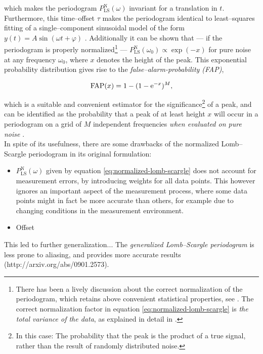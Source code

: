 which makes the periodogram $P^{\text{N}}_{\text{LS}}(\omega)$ invariant for a translation in $t$. Furthermore, this time--offset $\tau$ makes the periodogram identical to least--squares fitting of a single--component sinusoidal model of the form $y(t) = A \sin(\omega t + \varphi)$ \citep{horne1986, vanderplas2015}. Additionally it can be shown that --- if the periodogram is properly normalized\footnote{There has been a lively discussion about the correct normalization of the periodogram, which retains above convenient statistical properties, see \citet{lomb1976,astroML,zechmeister2009}. The correct normalization factor in equation \ref{eq:normalized-lomb-scargle} is \emph{the total variance of the data}, as explained in detail in \citet{horne1986}.} --- $P^{\text{N}}_{\text{LS}}(\omega_0) \propto \exp(-x)$ for pure noise at any frequency $\omega_0$, where $x$ denotes the height of the peak. This exponential probability distribution gives rise to the \emph{false--alarm-probability (FAP)},

\begin{equation}
\text{FAP}(x) = 1 - (1 - \mathrm{e}^{-x})^M,
\end{equation}

which is a suitable and convenient estimator for the significance\footnote{In this case: The probability that the peak is the product of a true signal, rather than the result of randomly distributed noise.} of a peak, and can be identified as the probability that a peak of at least height $x$ will occur in a periodogram on a grid of $M$ independent frequencies \emph{when evaluated on pure noise} \citep{horne1986}.\\

In spite of its usefulness, there are some drawbacks of the normalized Lomb--Scargle periodogram in its original formulation:

\begin{itemize}
\item $P^{\text{N}}_{\text{LS}}(\omega)$ given by equation \ref{eq:normalized-lomb-scargle} does not account for measurement errors, \eg by introducing weights for all data points. This however ignores an important aspect of the measurement process, where some data points might in fact be more accurate than others, for example due to changing conditions in the measurement environment.
\item Offset
\end{itemize}

This led to further generalization...
The \emph{generalized Lomb--Scargle periodogram} is less prone to aliasing, and provides more accurate results (http://arxiv.org/abs/0901.2573).

